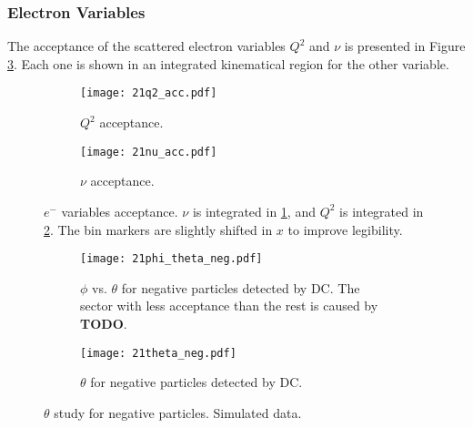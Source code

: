 \subsubsection{Electron Variables}
\label{14.21::electron_variables}
    The acceptance of the scattered electron variables $Q^2$ and $\nu$ is presented in Figure \ref{fig::14.21::electron_acc}.
    Each one is shown in an integrated kinematical region for the other variable.

    \begin{figure}[t!]
        \centering
        \begin{subfigure}[b]{\textwidth}
            \centering
            \texttt{[image: 21q2\_acc.pdf]}
            \caption{$Q^2$ acceptance.}
            \label{fig::14.21::q2_acc}
        \end{subfigure}
        \hfill
        \begin{subfigure}[b]{\textwidth}
            \centering
            \texttt{[image: 21nu\_acc.pdf]}
            \caption{$\nu$ acceptance.}
            \label{fig::14.21::nu_acc}
        \end{subfigure}
        \caption[$e^-$ variables acceptance]
        {$e^-$ variables acceptance.
        $\nu$ is integrated in \ref{fig::14.21::q2_acc}, and $Q^2$ is integrated in \ref{fig::14.21::nu_acc}.
        The bin markers are slightly shifted in $x$ to improve legibility.}
        \label{fig::14.21::electron_acc}
    \end{figure}

    \begin{figure}
        \centering
        \begin{subfigure}[b]{\textwidth}
            \centering
            \texttt{[image: 21phi\_theta\_neg.pdf]}
            \caption[$\phi$ vs. $\theta$ for negative particles]
            {$\phi$ vs. $\theta$ for negative particles detected by DC.
            The sector with less acceptance than the rest is caused by \textbf{TODO}.}
            \label{fig::14.21::phi_theta_neg}
        \end{subfigure}
        \begin{subfigure}[b]{\textwidth}
            \centering
            \texttt{[image: 21theta\_neg.pdf]}
            \caption[$\theta$ for negative particles]
            {$\theta$ for negative particles detected by DC.}
            \label{fig::14.21::theta_neg}
        \end{subfigure}
        \caption[$\theta$ study for negative particles]
        {$\theta$ study for negative particles.
        Simulated data.}
        \label{fig::14.21::theta_study_neg}
    \end{figure}

